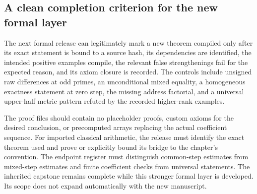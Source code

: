\subsection{A clean completion criterion for the new formal layer}
The next formal release can legitimately mark a new theorem compiled only after its exact statement is bound to a source hash, its dependencies are identified, the intended positive examples compile, the relevant false strengthenings fail for the expected reason, and its axiom closure is recorded. The controls include unsigned raw differences at odd primes, an unconditional mixed equality, a homogeneous exactness statement at zero step, the missing address factorial, and a universal upper-half metric pattern refuted by the recorded higher-rank examples.

The proof files should contain no placeholder proofs, custom axioms for the desired conclusion, or precomputed arrays replacing the actual coefficient sequence. For imported classical arithmetic, the release must identify the exact theorem used and prove or explicitly bound its bridge to the chapter's convention. The endpoint register must distinguish common-step estimates from mixed-step estimates and finite coefficient checks from universal statements. The inherited capstone remains complete while this stronger formal layer is developed. Its scope does not expand automatically with the new manuscript.
